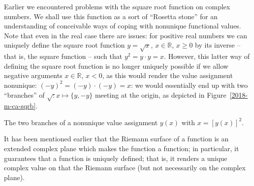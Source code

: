 Earlier we encountered problems with the square root function on complex numbers.
We shall use this function as a sort of ``Rosetta stone'' for an understanding of conceivable ways of coping with nonunique functional values.
Note that even in the real case there  are issues:
for positive real numbers we can uniquely define the square root function $y=\sqrt{x}$, $x\in \mathbb{R}$, $x\ge 0$ by its inverse -- that is,
the square function -- such that $y^2=y\cdot y =x$.
However, this latter way of defining the square root function is no longer uniquely possible if we allow negative arguments $x\in \mathbb{R}$, $x < 0$,
as this would render the value assignment nonunique:  $(-y)^2=(-y)\cdot (-y) =x$: we would essentially end up with two ``branches'' of $\sqrt : x \mapsto \{y,-y\}$
meeting at the origin,
as depicted in Figure~\ref{2018-m-ca-sqrb}.
\begin{marginfigure}
{\color{black}
\begin{center}
\end{center}
}
\caption{The two branches of a nonunique value assignment $y(x)$ with $x =\left[y(x)\right]^2$.
}
\label{2018-m-ca-sqrb}
\end{marginfigure}


It has been mentioned earlier that the Riemann surface of a function is an extended complex plane which makes the function a function; in particular,
it guarantees that a function is uniquely defined; that is, it renders a unique complex value on that the Riemann surface (but not necessarily on the complex plane).

